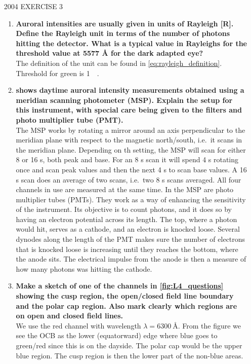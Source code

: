 \begin{enumerate}
\begin{enumerate}
    \end{enumerate}
    \item [2004 EXERCISE 3]~\\\vspace{-5mm} \begin{enumerate}
        \item \textbf{Auroral intensities are usually given in units of Rayleigh [R]. Define the Rayleigh unit in terms of the number of photons hitting the detector. What is a typical value in Rayleighs for the threshold value at 5577 Å for the dark adapted eye?}\\ The definition of the unit can be found in \cref{eq:rayleigh_definition}. Threshold for green is \SI{1}{\kilo\ray}.
        \item \textbf{ shows daytime auroral intensity measurements obtained using a meridian scanning photometer (MSP). Explain the setup for this instrument, with special care being given to the filters and photo multiplier tube (PMT).}\\ The MSP works by rotating a mirror around an axis perpendicular to the meridian plane with respect to the magnetic north/south, i.e.\ it scans in the meridian plane. Depending on th setting, the MSP will scan for either 8 or 16 s, both peak and base. For an 8 s scan it will spend 4 s rotating once and scan peak values and then the next 4 s to scan base values. A 16 s scan does an average of two scans, i.e.\ two 8 s scans averaged. All four channels in use are measured at the same time. In the MSP are photo multiplier tubes (PMTs). They work as a way of enhancing the sensitivity of the instrument. Its objective is to count photons, and it does so by having an electron potential across its length. The top, where a photon would hit, serves as a cathode, and an electron is knocked loose. Several dynodes along the length of the PMT makes sure the number of electrons that is knocked loose is increasing until they reaches the bottom, where the anode sits. The electrical impulse from the anode is then a measure of how many photons was hitting the cathode.
        \item \textbf{Make a sketch of one of the channels in \cref{fig:L4_questions} showing the cusp region, the open/closed field line boundary and the polar cap region. Also mark clearly which regions are on open and closed field lines.}\\ We use the red channel with wavelength \(\lambda=\SI{6300}{\angstrom}\). From the figure we see the OCB as the lower (equatorward) edge where blue goes to green/red since this is on the dayside. The polar cap would be the upper blue region. The cusp region is then the lower part of the non-blue areas.

\end{enumerate}
\end{enumerate}
